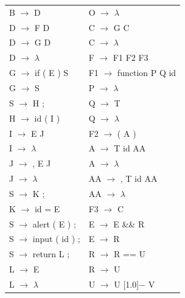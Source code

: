 \documentclass[11pt, , a4paper, titlepage]{article}
\newcommand{\minus}{\scalebox{0.75}[1.0]{$-$}}
\begin{document}
\begin{tabular}{ l l }
    B $\rightarrow$ D                       & O $\rightarrow$ $\lambda$                      \\
    D $\rightarrow$ F D                     & C $\rightarrow$ G C                            \\
    D $\rightarrow$ G D                     & C $\rightarrow$ $\lambda$                      \\
    D $\rightarrow$ $\lambda$               & F $\rightarrow$ F1 F2 F3                       \\
    G $\rightarrow$ if ( E ) S              & F1 $\rightarrow$ function P Q id               \\
    G $\rightarrow$ S                       & P $\rightarrow$ $\lambda$                      \\
    S $\rightarrow$ H ;                     & Q $\rightarrow$ T                              \\
    H $\rightarrow$ id ( I )                & Q $\rightarrow$ $\lambda$                      \\
    I $\rightarrow$ E J                     & F2 $\rightarrow$ ( A )                         \\
    I $\rightarrow$ $\lambda$               & A $\rightarrow$ T id AA                        \\
    J $\rightarrow$ , E J                   & A $\rightarrow$ $\lambda$                      \\
    J $\rightarrow$ $\lambda$               & AA $\rightarrow$ , T id AA                     \\
    S $\rightarrow$ K ;                     & AA $\rightarrow$ $\lambda$                     \\
    K $\rightarrow$ id = E                  & F3 $\rightarrow$ { C }                         \\
    S $\rightarrow$ alert ( E ) ;           & E $\rightarrow$ E \&\& R                       \\
    S $\rightarrow$ input ( id ) ;          & E $\rightarrow$ R                              \\
    S $\rightarrow$ return L ;              & R $\rightarrow$ R == U                         \\
    L $\rightarrow$ E                       & R $\rightarrow$ U                              \\
    L $\rightarrow$ $\lambda$               & U $\rightarrow$ U \minus\hspace{0.1cm} V       \\

\end{tabular}
\end{document}
